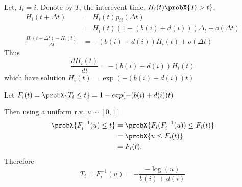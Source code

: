 \begin{frame}{}
    Let, $I_t = i$. Denote by $T_i$ the interevent time.
    $H_i(t) \probX{T_i>t}$.
    \begin{align*}
        H_i(t + \Delta t) &= H_i(t) p_{ii}(\Delta t)
        \\
            &=H_i(t)(1 -(b(i) + d(i)) ) \Delta_t + o(\Delta t)
        \\
        \frac{H_i(t + \Delta t) - H_i(t)}{\Delta t } 
            &= -(b(i)+d(i))H_i(t) + o(\Delta t)
    \end{align*}
    Thus
    $$
        \frac{d H_i(t)}{dt} = -(b(i)+d(i))H_i(t)
    $$
    which have solution
    $
        H_i(t) = \exp(-(b(i)+d(i)) t )
    $
\end{frame}
\begin{frame}{}
    Let $F_i(t) = \probX{T_i \leq t}
        = 1- exp(-(b(i)+d(i)) t )
    $ 
    
    Then using a uniform r.v. $u\sim [0,1]$
    \begin{align*}
        \probX{F_i^{-1}(u)\leq t}
            &=
            \probX{F_i(F_i^{-1}(u)) \leq F_i(t)}
            \\
            &=
            \probX{u \leq F_i(t)}
            \\
            &=
            F_i(t).
    \end{align*}
    Therefore
    $$
        T_i =
        F_i^{-1}(u) = -\frac{-\log(u)}{b(i)+d(i)}
    $$
\end{frame}
